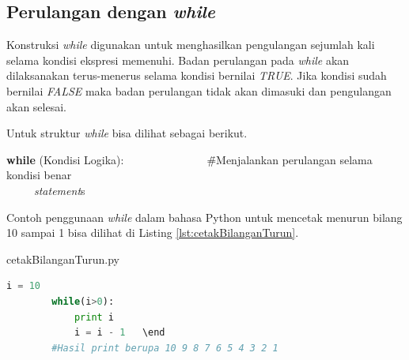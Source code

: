 \subsection{Perulangan dengan \textit{while}}
Konstruksi \textit{while} digunakan untuk menghasilkan pengulangan sejumlah kali selama kondisi ekspresi memenuhi. Badan perulangan pada \textit{while} akan dilaksanakan terus-menerus selama kondisi bernilai \textit{TRUE}. Jika kondisi sudah bernilai \textit{FALSE} maka badan perulangan tidak akan dimasuki dan pengulangan akan selesai.

\FloatBarrier
Untuk struktur \textit{while} bisa dilihat sebagai berikut.
\begin{tabbing}
\textbf{while} (Kondisi Logika):~~~~~~~~~~~~~~~\=\#Menjalankan perulangan selama kondisi benar\\
~~~~~\textit{statement}s\\
\end{tabbing}

Contoh penggunaan \textit{while} dalam bahasa Python untuk mencetak menurun bilang 10 sampai 1 bisa dilihat di Listing \ref{lst:cetakBilanganTurun}.
\begin{listprog}{cetakBilanganTurun.py}
	\label{lst:cetakBilanganTurun}
	\begin{lstlisting}[language=Python]
		i = 10
		while(i>0):
			print i
			i = i - 1	\end
		#Hasil print berupa 10 9 8 7 6 5 4 3 2 1
	\end{lstlisting}
\end{listprog}


